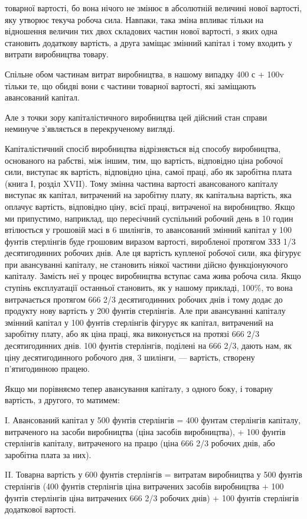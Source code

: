 товарної вартості, бо вона нічого не змінює в абсолютній величині
нової вартості, яку утворює текуча робоча сила. Навпаки,
така зміна впливає тільки на відношення величин тих двох складових
частин нової вартості, з яких одна становить додаткову
вартість, а друга заміщає змінний капітал і тому входить у витрати
виробництва товару.

Спільне обом частинам витрат виробництва, в нашому випадку
400 с + 100v тільки те, що обидві вони є частини товарної
вартості, які заміщають авансований капітал.

Але з точки зору капіталістичного виробництва цей дійсний
стан справи неминуче з’являється в перекрученому вигляді.

Капіталістичний спосіб виробництва відрізняється від способу
виробництва, основаного на рабстві, між іншим, тим, що
вартість, відповідно ціна робочої сили, виступає як вартість,
відповідно ціна, самої праці, або як заробітна плата (книга І,
розділ XVII). Тому змінна частина вартості авансованого капіталу
виступає як капітал, витрачений на заробітну плату,
як капітальна вартість, яка оплачує вартість, відповідно ціну,
всієї праці, витраченої на виробництво. Якщо ми припустимо,
наприклад, що пересічний суспільний робочий день в 10 годин
втілюється у грошовій масі в 6 шилінгів, то авансований
змінний капітал у 100 фунтів стерлінгів буде грошовим
виразом вартості, виробленої протягом ЗЗЗ 1/3 десятигодинних
робочих днів. Але ця вартість купленої робочої сили, яка фігурує
при авансуванні капіталу, не становить ніякої частини
дійсно функціонуючого капіталу. Замість неї у процес виробництва
вступає сама жива робоча сила. Якщо ступінь експлуатації
останньої становить, як у нашому прикладі, 100\%, то вона
витрачається протягом 666 2/3 десятигодинних робочих днів і тому
додає до продукту нову вартість у 200 фунтів стерлінгів. Але
при авансуванні капіталу змінний капітал у 100 фунтів стерлінгів
фігурує як капітал, витрачений на заробітну плату, або як
ціна праці, яка виконується на протязі 666 2/3 десятигодинних
днів. 100 фунтів стерлінгів, поділені на 666 2/3, дають нам, як
ціну десятигодинного робочого дня, 3 шилінги, — вартість, створену
п’ятигодинною працею.

Якщо ми порівняємо тепер авансування капіталу, з одного
боку, і товарну вартість, з другого, то матимем:

I. Авансований капітал у 500 фунтів стерлінгів = 400 фунтам
стерлінгів капіталу, витраченого на засоби виробництва
(ціна засобів виробництва), + 100 фунтів стерлінгів капіталу,
витраченого на працю (ціна 666 2/3 робочих днів, або заробітна
плата за них).

II. Товарна вартість у 600 фунтів стерлінгів = витратам виробництва
у 500 фунтів стерлінгів (400 фунтів стерлінгів
ціна витрачених засобів виробництва + 100 фунтів стерлінгів
ціна витрачених 666 2/3 робочих днів) + 100 фунтів
стерлінгів додаткової вартості.
